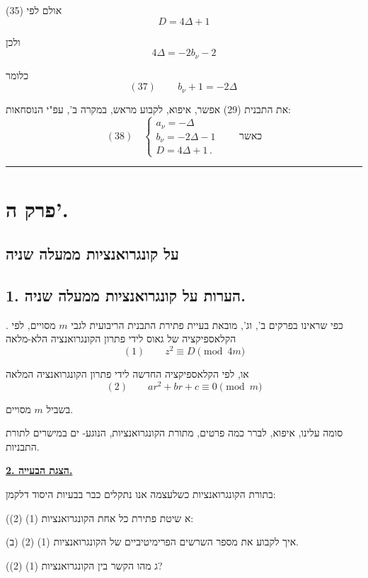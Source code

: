 \noindent אולם לפי (35)
\[ D = 4\Delta + 1 \]

\noindent ולכן
\[ 4\Delta = -2b_\nu - 2 \]

\noindent כלומר
\[ (37) \qquad \boxed{\, b_\nu + 1 = -2\Delta \,} \]

\noindent את התבנית (29) אפשר, איפוא, לקבוע מראש, במקרה ב', עפ"י
הנוסחאות:
\[ (38) \quad \left\{ \begin{array}{l}
a_\nu = -\Delta \\
b_\nu = -2\Delta - 1 \\
D = 4\Delta + 1 \, .
\end{array} \right. \qquad \text{כאשר} \]

\bigskip
\hrule
\bigskip

\section*{פרק ה'.}

\subsection*{על קונגרואנציות ממעלה שניה}

\subsection*{1. הערות על קונגרואנציות ממעלה שניה.}

. כפי שראינו בפרקים ב', וג', מובאת בעיית פתירת התבנית הריבועית
לגבי $m$ מסויים, לפי הקלאספיקציה של גאוס לידי פתרון הקונגרואנציה
הלא-מלאה
\[ (1) \qquad z^2 \equiv D \pmod{4m} \]

\noindent או, לפי הקלאספיקציה החדשה לידי פתרון הקונגרואנציה המלאה
\[ (2) \qquad ar^2 + br + c \equiv 0 \pmod{m} \]

\noindent בשביל $m$ מסויים.

\noindent סומה עלינו, איפוא, לברר כמה פרטים, מתורת הקונגרואנציות, הנוגע-
ים במישרים לתורת התבניות.

\medskip
\noindent\textbf{\underline{2. הצגת הבעייה.}}

\noindent בתורת הקונגרואנציות כשלעצמה אנו נתקלים כבר בבעיות היסוד דלקמן:

\noindent (א שיטת פתירת כל אחת הקונגרואנציות (1) (2):

\noindent (ב) איך לקבוע את מספר השרשים הפרימיטיביים של הקונגרואנציות
(1) (2).

\noindent (ג מהו הקשר בין הקונגרואנציות (1) (2)?

